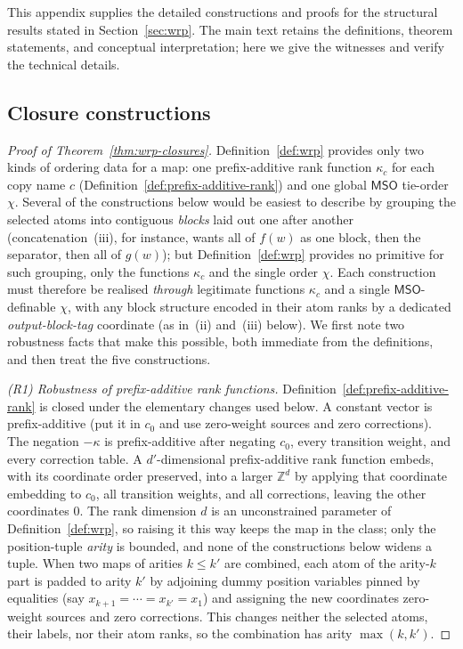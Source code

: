 \documentclass[11pt]{article}
\theoremstyle{definition}
\newcommand{\Z}{\mathbb Z}
\newcommand{\MSO}{\mathsf{MSO}}
\begin{document}
This appendix supplies the detailed constructions and proofs for the
structural results stated in Section~\ref{sec:wrp}.  The main text retains the
definitions, theorem statements, and conceptual interpretation; here we give
the witnesses and verify the technical details.

\subsection{Closure constructions}

\begin{proof}[Proof of Theorem~\ref{thm:wrp-closures}]
Definition~\ref{def:wrp} provides only two kinds of ordering data for a map:
one prefix-additive rank function $\kappa_c$ for each copy name $c$
(Definition~\ref{def:prefix-additive-rank}) and one global $\MSO$ tie-order
$\chi$.
Several of the constructions below would be
easiest to describe by grouping the selected atoms into contiguous \emph{blocks}
laid out one after another (concatenation~(iii), for instance, wants all of
$f(w)$ as one block, then the separator, then all of $g(w)$); but
Definition~\ref{def:wrp} provides no primitive for such grouping, only the
functions $\kappa_c$ and the single order $\chi$.  Each construction must
therefore be realised \emph{through} legitimate functions $\kappa_c$ and a
single $\MSO$-definable $\chi$, with any block structure encoded in their atom
ranks by a dedicated \emph{output-block-tag} coordinate (as in~(ii) and~(iii)
below).  We first note two robustness facts that make this possible, both
immediate from the definitions, and then treat the five constructions.

\vspace{0.5em}
\noindent\emph{(R1) Robustness of prefix-additive rank functions.}
Definition~\ref{def:prefix-additive-rank} is closed under the elementary
changes used below.  A constant vector is prefix-additive (put it in $c_0$ and
use zero-weight sources and zero corrections).  The negation $-\kappa$ is
prefix-additive after negating $c_0$, every transition weight, and every
correction table.  A $d'$-dimensional prefix-additive rank function embeds,
with its coordinate order preserved, into a larger $\Z^d$ by applying that
coordinate embedding to $c_0$, all transition weights, and all corrections,
leaving the other coordinates $0$.  The rank
dimension $d$ is an unconstrained parameter of Definition~\ref{def:wrp}, so
raising it this way keeps the map in the class; only the
position-tuple \emph{arity} is bounded, and none of the constructions below
widens a tuple.  When two maps of arities $k\le k'$ are combined, each
atom of the arity-$k$ part is padded to arity $k'$ by adjoining dummy position
variables pinned by equalities (say $x_{k+1}=\cdots=x_{k'}=x_1$) and assigning
the new coordinates zero-weight sources and zero corrections.  This changes
neither the selected atoms, their labels, nor their atom ranks, so the combination
has arity $\max(k,k')$.


\end{proof}
\end{document}
